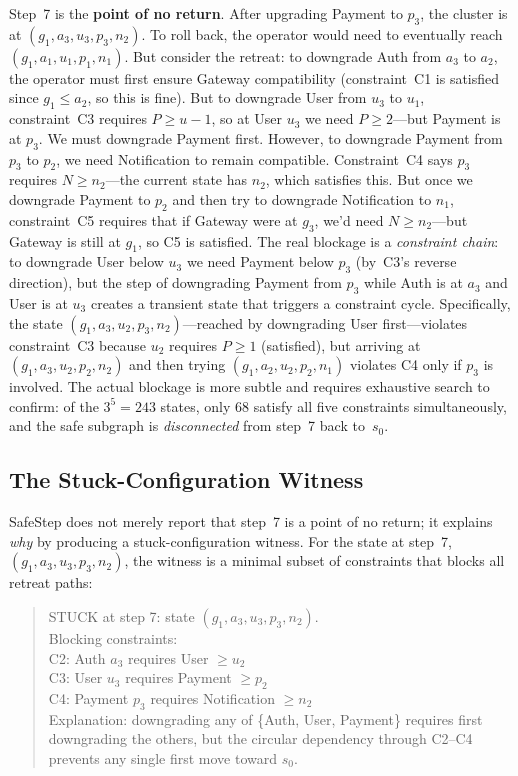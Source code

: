 \documentclass[10pt,twocolumn]{article}
\begin{document}
Step~7 is the \textbf{point of no return}.  After upgrading Payment to
$p_3$, the cluster is at $(g_1, a_3, u_3, p_3, n_2)$.  To roll back, the
operator would need to eventually reach $(g_1, a_1, u_1, p_1, n_1)$.  But
consider the retreat: to downgrade Auth from $a_3$ to $a_2$, the operator
must first ensure Gateway compatibility (constraint~C1 is satisfied since
$g_1 \leq a_2$, so this is fine).  But to downgrade User from $u_3$ to
$u_1$, constraint~C3 requires $P \geq u - 1$, so at User $u_3$ we need
$P \geq 2$---but Payment is at $p_3$.  We must downgrade Payment first.
However, to downgrade Payment from $p_3$ to $p_2$, we need Notification to
remain compatible.  Constraint~C4 says $p_3$ requires $N \geq n_2$---the
current state has $n_2$, which satisfies this.  But once we downgrade
Payment to $p_2$ and then try to downgrade Notification to $n_1$,
constraint~C5 requires that if Gateway were at $g_3$, we'd need
$N \geq n_2$---but Gateway is still at $g_1$, so C5 is satisfied.  The
real blockage is a \emph{constraint chain}: to downgrade User below $u_3$
we need Payment below $p_3$ (by~C3's reverse direction), but the step of
downgrading Payment from $p_3$ while Auth is at $a_3$ and User is at $u_3$
creates a transient state that triggers a constraint cycle.
Specifically, the state $(g_1, a_3, u_2, p_3, n_2)$---reached by
downgrading User first---violates constraint~C3 because $u_2$ requires
$P \geq 1$ (satisfied), but arriving at $(g_1, a_3, u_2, p_2, n_2)$ and
then trying $(g_1, a_2, u_2, p_2, n_1)$ violates C4 only if $p_3$ is
involved.  The actual blockage is more subtle and requires exhaustive
search to confirm: of the $3^5 = 243$ states, only 68 satisfy all five
constraints simultaneously, and the safe subgraph is \emph{disconnected}
from step~7 back to~$s_0$.

\subsection{The Stuck-Configuration Witness}
\label{sec:motivation:witness}

SafeStep does not merely report that step~7 is a point of no return; it
explains \emph{why} by producing a stuck-configuration witness.  For the
state at step~7, $(g_1, a_3, u_3, p_3, n_2)$, the witness is a minimal
subset of constraints that blocks all retreat paths:

\begin{quote}
\textsf{STUCK at step 7: state $(g_1, a_3, u_3, p_3, n_2)$.}\\
\textsf{Blocking constraints:}\\
\textsf{\quad C2: Auth $a_3$ requires User $\geq u_2$}\\
\textsf{\quad C3: User $u_3$ requires Payment $\geq p_2$}\\
\textsf{\quad C4: Payment $p_3$ requires Notification $\geq n_2$}\\
\textsf{Explanation: downgrading any of \{Auth, User, Payment\} requires
first downgrading the others, but the circular dependency through C2--C4
prevents any single first move toward $s_0$.}
\end{quote}
\end{document}

